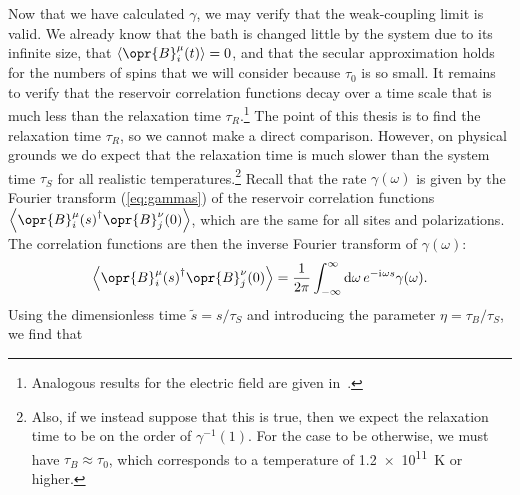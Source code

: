 \documentclass[../thesis.tex]{subfiles}
\begin{document}
Now that we have calculated $\gamma$, we may verify that the weak-coupling limit
is valid. We already know that the bath is changed little by the system due to
its infinite size, that $\ev{\opr{B}_i^\mu(t)} = 0$, and that the secular
approximation holds for the numbers of spins that we will consider because
$\tau_0$ is so small. It remains to verify that the reservoir correlation
functions decay over a time scale that is much less than the relaxation time
$\tau_R$.\footnote{%
  Analogous results for the electric field are given in~\cite[p.~574]{opensys}.
}
The point of this thesis is to find the relaxation time $\tau_R$, so we cannot
make a direct comparison. However, on physical grounds we do expect that the
relaxation time is much slower than the system time $\tau_S$ for all realistic
temperatures.\footnote{%
  Also, if we instead suppose that this is true, then we expect the relaxation
  time to be on the order of $\gamma^{-1}(1)$. For the case to be otherwise, we
  must have $\tau_B \approx \tau_0$, which corresponds to a temperature of
  \SI{1.2e11}{\K} or higher.
}
Recall that the rate $\gamma(\omega)$ is given by the Fourier transform
(\cref{eq:gammas}) of the reservoir correlation functions
$\ev{\opr{B}_i^\mu{(s)}^\dag\opr{B}_j^\nu(0)}$, which are the same for all sites
and polarizations. The correlation functions are then the inverse Fourier
transform of $\gamma(\omega)$:
\begin{equation}
  \ev{\opr{B}_i^\mu{(s)}^\dag\opr{B}_j^\nu(0)}
  = \frac{1}{2\pi}\int_{-\infty}^\infty \dd{\omega} e^{-\im\omega s}
  \gamma(\omega).
\end{equation}
Using the dimensionless time $\tilde{s} = s / \tau_S$ and introducing the
parameter $\eta = \tau_B / \tau_S$, we find that
\end{document}
